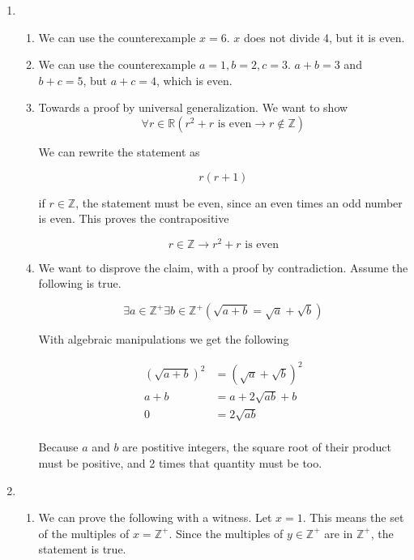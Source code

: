 \documentclass{article}
\newcommand{\R}{\mathbb{R}}
\newcommand{\Z}{\mathbb{Z}}
\begin{document}
\begin{enumerate}
	\item \begin{enumerate}
		      \item We can use the counterexample $x=6$. $x$ does not divide
		            4, but it is even.
		      \item We can use the counterexample $a=1, b=2, c=3$. $a+b = 3$ and
		            $b + c = 5$, but $a+c = 4$, which is even.

		      \item Towards a proof by universal generalization. We want to show
		            $$
			            \forall r \in \R (r^2 + r \text{ is even} \to r \notin \Z)
		            $$

		            We can rewrite the statement as

		            $$
			            r(r + 1)
		            $$

		            if $r \in \Z$, the statement must be even, since an even
		            times an odd number is even. This proves the contrapositive

		            $$
			            r \in \Z \to r^2 + r \text{ is even}
		            $$

		      \item We want to disprove the claim, with a proof by contradiction. Assume the following
		            is true.

		            $$
			            \exists a \in \Z^+ \exists b \in \Z^+ ( \sqrt{a + b} = \sqrt a + \sqrt b)
		            $$

		            With algebraic manipulations we get the following

		            \begin{align*}
			            (\sqrt{a + b})^2 & = (\sqrt a + \sqrt b)^2 \\
			            a + b            & = a + 2 \sqrt{ab} + b   \\
			            0                & = 2 \sqrt{ab}           \\
		            \end{align*}

		            Because $a$ and $b$ are postitive integers, the square root of
		            their product must be positive, and 2 times that quantity must be too.
	      \end{enumerate}

	\item \begin{enumerate}
		      \item We can prove the following with a witness. Let $x = 1$. This means the
		            set of the multiples of $x = \Z^+$. Since the multiples of $y \in \Z^+$ are in $\Z^+$,
		            the statement is true.


\end{enumerate}
\end{enumerate}
\end{document}
